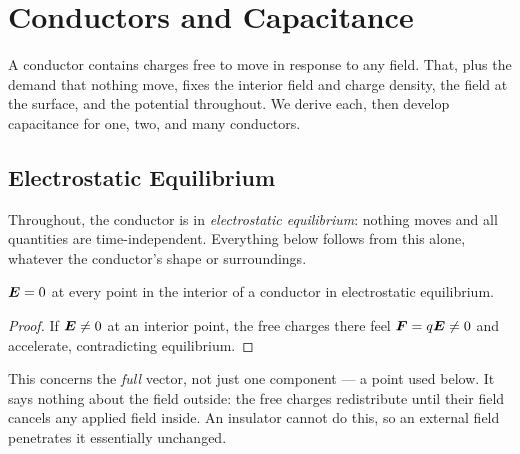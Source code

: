 \chapter{Conductors and Capacitance}

A conductor contains charges free to move in response to any field. That, plus the demand that nothing move, fixes the interior field and charge density, the field at the surface, and the potential throughout. We derive each, then develop capacitance for one, two, and many conductors.

\section{Electrostatic Equilibrium}

Throughout, the conductor is in \emph{electrostatic equilibrium}: nothing moves and all quantities are time-independent. Everything below follows from this alone, whatever the conductor's shape or surroundings.

\begin{theorem}
$\vect{E} = 0$ at every point in the interior of a conductor in electrostatic equilibrium.
\end{theorem}

\begin{proof}
If $\vect{E}\neq 0$ at an interior point, the free charges there feel $\vect{F}=q\vect{E}\neq 0$ and accelerate, contradicting equilibrium.
\end{proof}

This concerns the \emph{full} vector, not just one component --- a point used below. It says nothing about the field outside: the free charges redistribute until their field cancels any applied field inside. An insulator cannot do this, so an external field penetrates it essentially unchanged.

